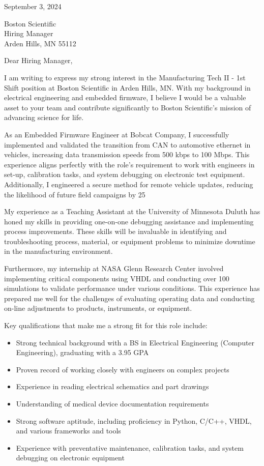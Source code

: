 \documentclass[letterpaper,11pt]{article}
\begin{document}
September 3, 2024

Boston Scientific \\
Hiring Manager \\
Arden Hills, MN 55112

Dear Hiring Manager,

I am writing to express my strong interest in the Manufacturing Tech II - 1st Shift position at Boston Scientific in Arden Hills, MN. With my background in electrical engineering and embedded firmware, I believe I would be a valuable asset to your team and contribute significantly to Boston Scientific's mission of advancing science for life.

As an Embedded Firmware Engineer at Bobcat Company, I successfully implemented and validated the transition from CAN to automotive ethernet in vehicles, increasing data transmission speeds from 500 kbps to 100 Mbps. This experience aligns perfectly with the role's requirement to work with engineers in set-up, calibration tasks, and system debugging on electronic test equipment. Additionally, I engineered a secure method for remote vehicle updates, reducing the likelihood of future field campaigns by 25%

My experience as a Teaching Assistant at the University of Minnesota Duluth has honed my skills in providing one-on-one debugging assistance and implementing process improvements. These skills will be invaluable in identifying and troubleshooting process, material, or equipment problems to minimize downtime in the manufacturing environment.

Furthermore, my internship at NASA Glenn Research Center involved implementing critical components using VHDL and conducting over 100 simulations to validate performance under various conditions. This experience has prepared me well for the challenges of evaluating operating data and conducting on-line adjustments to products, instruments, or equipment.

Key qualifications that make me a strong fit for this role include:
\begin{itemize}
    \item Strong technical background with a BS in Electrical Engineering (Computer Engineering), graduating with a 3.95 GPA
    \item Proven record of working closely with engineers on complex projects
    \item Experience in reading electrical schematics and part drawings
    \item Understanding of medical device documentation requirements
    \item Strong software aptitude, including proficiency in Python, C/C++, VHDL, and various frameworks and tools
    \item Experience with preventative maintenance, calibration tasks, and system debugging on electronic equipment
\end{itemize}
\end{document}
